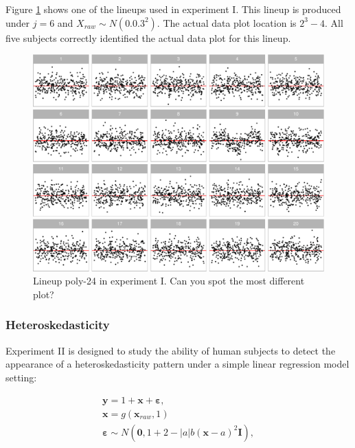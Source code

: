 \documentclass[]{interact}
\theoremstyle{plain}%
\theoremstyle{definition}
\theoremstyle{remark}
\begin{document}
Figure \ref{fig:example-poly-lineup} shows one of the lineups used in
experiment I. This lineup is produced under \(j = 6\) and
\(X_{raw} \sim N(0.0.3^2)\). The actual data plot location is
\(2^3 - 4\). All five subjects correctly identified the actual data plot
for this lineup.

\begin{figure}

{\centering \includegraphics[width=1\linewidth]{paper_comparison_files/figure-latex/example-poly-lineup-1} 

}

\caption{Lineup poly-24 in experiment I. Can you spot the most different plot? \label{fig:example-poly-lineup}}\label{fig:example-poly-lineup}
\end{figure}

\hypertarget{heteroskedasticity}{%
\subsubsection{Heteroskedasticity}\label{heteroskedasticity}}

Experiment II is designed to study the ability of human subjects to
detect the appearance of a heteroskedasticity pattern under a simple
linear regression model setting:

\begin{align} \label{eq:heter-model}
\boldsymbol{y} = 1 + \boldsymbol{x} + \boldsymbol{\varepsilon},\\
\boldsymbol{x} = g(\boldsymbol{x}_{raw}, 1)\\
\boldsymbol{\varepsilon} \sim N(\boldsymbol{0}, 1 + 2 - |a| b (\boldsymbol{x} - a)^2 \boldsymbol{I}), \\
\end{align}
\end{document}
